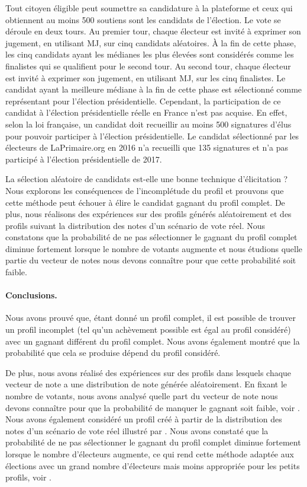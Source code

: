 	Tout citoyen éligible peut soumettre sa candidature à la plateforme et ceux qui obtiennent au moins 500 soutiens sont les candidats de l'élection. Le vote se déroule en deux tours.
	Au premier tour, chaque électeur est invité à exprimer son jugement, en utilisant \ac{MJ}, sur cinq candidats aléatoires. À la fin de cette phase, les cinq candidats ayant les médianes les plus élevées sont considérés comme les finalistes qui se qualifient pour le second tour. Au second tour, chaque électeur est invité à exprimer son jugement, en utilisant \ac{MJ}, sur les cinq finalistes. Le candidat ayant la meilleure médiane à la fin de cette phase est sélectionné comme représentant pour l'élection présidentielle.
	Cependant, la participation de ce candidat à l'élection présidentielle réelle en France n'est pas acquise. En effet, selon la loi française, un candidat doit recueillir au moins 500 signatures d'élus pour pouvoir participer à l'élection présidentielle. Le candidat sélectionné par les électeurs de LaPrimaire.org en 2016 n'a recueilli que 135 signatures et n'a pas participé à l'élection présidentielle de 2017. 
	
	La sélection aléatoire de candidats est-elle une bonne technique d'élicitation ? Nous explorons les conséquences de l'incomplétude du profil et prouvons que cette méthode peut échouer à élire le candidat gagnant du profil complet. De plus, nous réalisons des expériences sur des profils générés aléatoirement et des profils suivant la distribution des notes d'un scénario de vote réel. Nous constatons que la probabilité de ne pas sélectionner le gagnant du profil complet diminue fortement lorsque le nombre de votants augmente et nous étudions quelle partie du vecteur de notes nous devons connaître pour que cette probabilité soit faible.
	
	\paragraph{Conclusions.}
	Nous avons prouvé que, étant donné un profil complet, il est possible de trouver un profil incomplet (tel qu'un achèvement possible est égal au profil considéré) avec un gagnant différent du profil complet.
	Nous avons également montré que la probabilité que cela se produise dépend du profil considéré. 
	
	De plus, nous avons réalisé des expériences sur des profils dans lesquels chaque vecteur de note a une distribution de note générée aléatoirement. En fixant le nombre de votants, nous avons analysé quelle part du vecteur de note nous devons connaître pour que la probabilité de manquer le gagnant soit faible, voir .
	Nous avons également considéré un profil créé à partir de la distribution des notes d'un scénario de vote réel illustré par . Nous avons constaté que la probabilité de ne pas sélectionner le gagnant du profil complet diminue fortement lorsque le nombre d'électeurs augmente, ce qui rend cette méthode adaptée aux élections avec un grand nombre d'électeurs mais moins appropriée pour les petits profils, voir .
	
